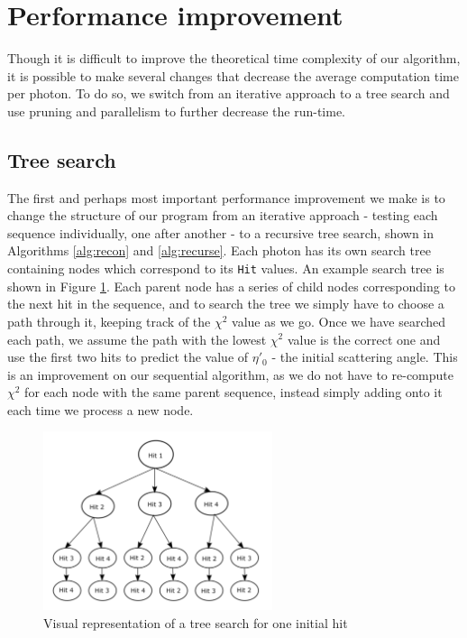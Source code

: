 \section{Performance improvement}
Though it is difficult to improve the theoretical time complexity of our algorithm, it is possible to make several changes that decrease the average computation time per photon. To do so, we switch from an iterative approach to a tree search and use pruning and parallelism to further decrease the run-time.

\subsection{Tree search}
The first and perhaps most important performance improvement we make is to change the structure of our program from an iterative approach - testing each sequence individually, one after another - to a recursive tree search, shown in Algorithms \ref{alg:recon} and \ref{alg:recurse}. Each photon has its own search tree containing nodes which correspond to its \texttt{Hit} values. An example search tree is shown in Figure \ref{fig:tree}. Each parent node has a series of child nodes corresponding to the next hit in the sequence, and to search the tree we simply have to choose a path through it, keeping track of the $\chi^2$ value as we go. Once we have searched each path, we assume the path with the lowest $\chi^2$ value is the correct one and use the first two hits to predict the value of $\eta'_0$ - the initial scattering angle. This is an improvement on our sequential algorithm, as we do not have to re-compute $\chi^2$ for each node with the same parent sequence, instead simply adding onto it each time we process a new node.

\begin{figure}
    \centering
    \includegraphics[width=0.6\textwidth]{tree_search_graphic.png}
    \caption{Visual representation of a tree search for one initial hit}
    \label{fig:tree}
\end{figure}

